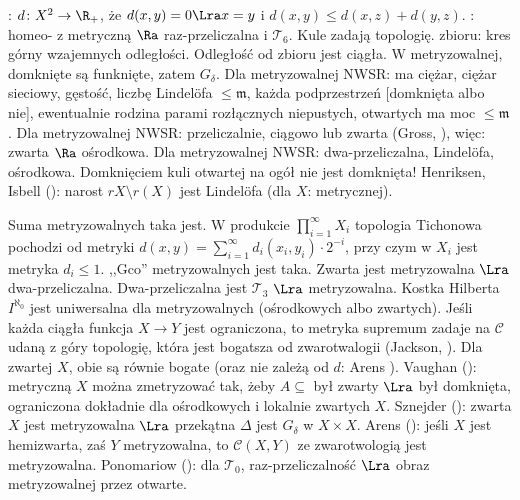 {\color{gray}
:  $d \colon X^2 \to \R_+$, że $d(x, y) = 0 \Lra x = y$ i $d(x,y) \le d(x,z) + d(y,z)$.
: homeo- z metryczną $\Ra$ raz-przeliczalna i $\mathcal T_6$.
Kule zadają topologię.
 zbioru: kres górny wzajemnych odległości.
Odległość od zbioru jest ciągła.
W metryzowalnej, domknięte są funknięte, zatem $G_\delta$.
Dla metryzowalnej NWSR: ma ciężar, ciężar sieciowy, gęstość, liczbę Lindelöfa $\le \mathfrak m$, każda podprzestrzeń [domknięta albo nie], ewentualnie rodzina parami rozłącznych niepustych, otwartych ma moc $\le \mathfrak m$.
Dla metryzowalnej NWSR: przeliczalnie, ciągowo lub zwarta (Gross, ), więc: zwarta $\Ra$ ośrodkowa.
Dla metryzowalnej NWSR: dwa-przeliczalna, Lindelöfa, ośrodkowa.
Domknięciem kuli otwartej na ogół nie jest domknięta!
Henriksen, Isbell (): narost $rX \setminus r(X)$ jest Lindelöfa (dla $X$: metrycznej).
}

Suma  metryzowalnych taka jest.
W produkcie $\prod_{i=1}^\infty X_i$ topologia Tichonowa pochodzi od metryki $d(x,y) = \sum_{i=1}^\infty d_i(x_i, y_i) \cdot 2^{-i}$, przy czym w $X_i$ jest metryka $d_i \le 1$.
,,Gco'' metryzowalnych jest taka.
Zwarta jest metryzowalna $\Lra$ dwa-przeliczalna.
Dwa-przeliczalna jest $\mathcal T_3$ $\Lra$ metryzowalna.
Kostka Hilberta $I^{\aleph_0}$ jest uniwersalna dla metryzowalnych (ośrodkowych albo zwartych).
Jeśli każda ciągła funkcja $X \to Y$ jest ograniczona, to metryka supremum zadaje na $\mathcal C$ udaną z góry topologię, która jest bogatsza od zwarotwalogii (Jackson, ).
Dla zwartej $X$, obie są równie bogate (oraz nie zależą od $d$: Arens ).
Vaughan (): metryczną $X$ można zmetryzować tak, żeby $A \subseteq$ był zwarty $\Lra$ był domknięta, ograniczona dokładnie dla ośrodkowych i lokalnie zwartych $X$.
Sznejder (): zwarta $X$ jest metryzowalna $\Lra$ przekątna $\Delta$ jest $G_\delta$ w $X \times X$.
Arens (): jeśli $X$ jest hemizwarta, zaś $Y$ metryzowalna, to $\mathcal C(X,Y)$ ze zwarotwologią jest metryzowalna.
Ponomariow (): dla $\mathcal T_0$, raz-przeliczalność $\Lra$ obraz metryzowalnej przez otwarte.

